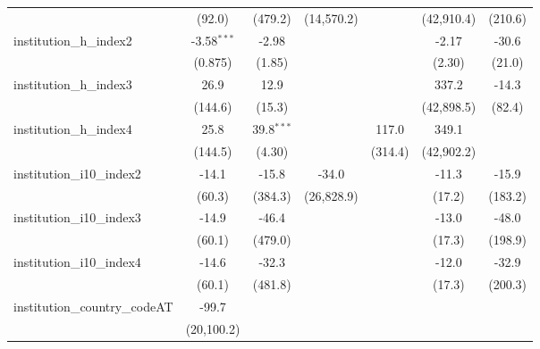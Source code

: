 \begin{tabular}{lcccccc}
                                         & (92.0)        & (479.2)      & (14,570.2)    &                & (42,910.4)    & (210.6)\\   
   institution\_h\_index2                & -3.58$^{***}$ & -2.98        &               &                & -2.17         & -30.6\\   
                                         & (0.875)       & (1.85)       &               &                & (2.30)        & (21.0)\\   
   institution\_h\_index3                & 26.9          & 12.9         &               &                & 337.2         & -14.3\\   
                                         & (144.6)       & (15.3)       &               &                & (42,898.5)    & (82.4)\\   
   institution\_h\_index4                & 25.8          & 39.8$^{***}$ &               & 117.0          & 349.1         &   \\   
                                         & (144.5)       & (4.30)       &               & (314.4)        & (42,902.2)    &   \\   
   institution\_i10\_index2              & -14.1         & -15.8        & -34.0         &                & -11.3         & -15.9\\   
                                         & (60.3)        & (384.3)      & (26,828.9)    &                & (17.2)        & (183.2)\\   
   institution\_i10\_index3              & -14.9         & -46.4        &               &                & -13.0         & -48.0\\   
                                         & (60.1)        & (479.0)      &               &                & (17.3)        & (198.9)\\   
   institution\_i10\_index4              & -14.6         & -32.3        &               &                & -12.0         & -32.9\\   
                                         & (60.1)        & (481.8)      &               &                & (17.3)        & (200.3)\\   
   institution\_country\_codeAT          & -99.7         &              &               &                &               &   \\   
                                         & (20,100.2)    &              &               &                &               &   \\   

\end{tabular}
